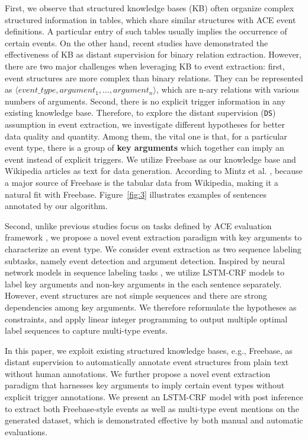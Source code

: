 First, we observe that structured knowledge bases (KB) often organize
complex structured information in tables, which share similar structures with ACE event definitions. A particular entry of such tables usually implies the occurrence of certain events.
On the other hand, recent studies \cite{mintz2009distant,zeng2015distant} have demonstrated the effectiveness of KB as distant supervision for binary relation extraction.
However, there are two major challenges when leveraging KB to event extraction: first, event structures are more complex than binary relations. They can be represented as $\langle event\_type, argument_1, \ldots, argument_n\rangle$, which are n-ary relations with various numbers of arguments. Second, there is no explicit trigger information in any existing knowledge base. Therefore, to explore the distant supervision (\texttt{DS}) assumption in event extraction, we investigate different hypotheses for better data quality and quantity. Among them, the vital one is that, for a particular event type, there is a group of \textbf{key arguments} which together can imply an event instead of explicit triggers.
We utilize Freebase as our knowledge base and Wikipedia articles as text for data generation. According to Mintz et al. , because a major source of Freebase is the tabular data from Wikipedia, making it a natural fit with Freebase. Figure~\ref{fig:3} illustrates examples of sentences annotated by our algorithm.

Second, unlike previous studies focus on tasks defined by ACE evaluation framework \cite{ahn2006stages,li2013joint,chen2015event,nguyen2016joint}, we propose a novel event extraction paradigm with key arguments to characterize an event type. We consider event extraction as two sequence labeling subtasks, namely event detection and argument detection. Inspired by neural network models in sequence labeling tasks \cite{huang2015bidirectional,lample2016neural}, we utilize LSTM-CRF models to label key arguments and non-key arguments in the each sentence separately. However, event structures are not simple sequences and there are strong dependencies among key arguments. We therefore reformulate the hypotheses as constraints, and apply linear integer programming to output multiple optimal label sequences to capture multi-type events.

In this paper, we exploit existing structured knowledge bases, e.g., Freebase, as distant supervision to automatically annotate event structures from plain text without human annotations. We further propose a novel event extraction paradigm that harnesses key arguments to imply certain event types without explicit trigger annotations. We present an LSTM-CRF model with post inference to extract both Freebase-style events as well as multi-type event mentions on the generated dataset, which is demonstrated effective by both manual and automatic evaluations.
